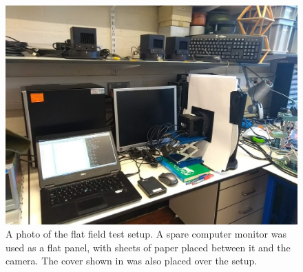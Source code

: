 \begin{colsection}
\begin{figure}[p]
    \begin{center}
        \includegraphics[width=0.75\linewidth]{images/flat_photo.jpg}
    \end{center}
    \caption[The flat field test setup]{
        A photo of the flat field test setup. A spare computer monitor was used as a flat panel, with sheets of paper placed between it and the camera. The cover shown in  was also placed over the setup.
    }\label{fig:flat_photo}
\end{figure}

\clearpage
\newpage

\end{colsection}


